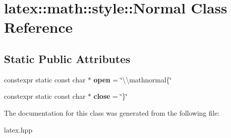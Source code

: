 \hypertarget{classlatex_1_1math_1_1style_1_1Normal}{\section{latex\-:\-:math\-:\-:style\-:\-:Normal Class Reference}
\label{classlatex_1_1math_1_1style_1_1Normal}
}
\subsection*{Static Public Attributes}
\begin{DoxyCompactItemize}
\item 
\hypertarget{classlatex_1_1math_1_1style_1_1Normal_a49ee8c066a06a3d15d61c077f56cc9d1}{constexpr static const char $\ast$ {\bfseries open} = \char`\"{}\textbackslash{}\textbackslash{}mathnormal\{\char`\"{}}\label{classlatex_1_1math_1_1style_1_1Normal_a49ee8c066a06a3d15d61c077f56cc9d1}

\item 
\hypertarget{classlatex_1_1math_1_1style_1_1Normal_abd05edd097677152f5828ae1ee4bea4d}{constexpr static const char $\ast$ {\bfseries close} = \char`\"{}\}\char`\"{}}\label{classlatex_1_1math_1_1style_1_1Normal_abd05edd097677152f5828ae1ee4bea4d}

\end{DoxyCompactItemize}


The documentation for this class was generated from the following file\-:\begin{DoxyCompactItemize}
\item 
latex.\-hpp\end{DoxyCompactItemize}
